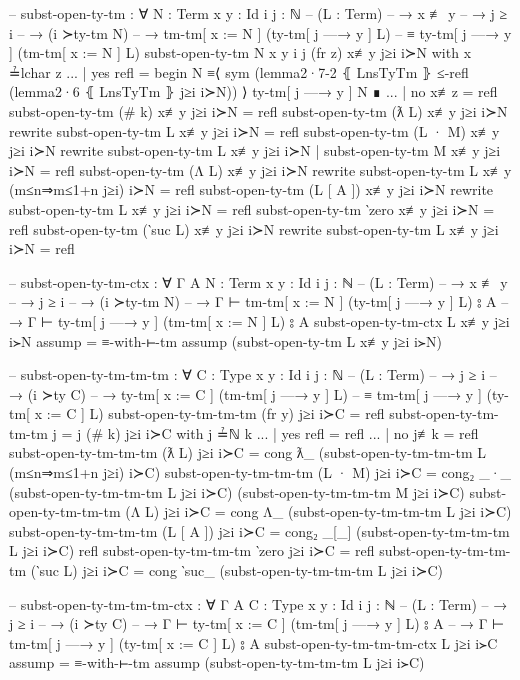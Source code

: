 \documentclass[logo,bsc,singlespacing,parskip,online]{infthesis}
\begin{document}
\begin{code}
  -- subst-open-ty-tm : ∀ {N : Term} {x y : Id} {i j : ℕ}
  --   (L : Term)
  --   → x ≢ y
  --   → j ≥ i
  --   → (i ≻ty-tm N)
  --   → tm-tm[ x := N ] (ty-tm[ j —→ y ] L)
  --     ≡ ty-tm[ j —→ y ] (tm-tm[ x := N ] L)
  subst-open-ty-tm {N} {x} {y} {i} {j} (fr z) x≢y j≥i i≻N with x ≟lchar z
  ... | yes refl =
    begin
      N
    ≡⟨ sym (lemma2·7-2 ⦃ LnsTyTm ⦄ ≤-refl (lemma2·6 ⦃ LnsTyTm ⦄ j≥i i≻N)) ⟩
      ty-tm[ j —→ y ] N
    ∎
  ... | no  x≢z  = refl
  subst-open-ty-tm (# k) x≢y j≥i i≻N = refl
  subst-open-ty-tm (ƛ L) x≢y j≥i i≻N
    rewrite subst-open-ty-tm L x≢y j≥i i≻N = refl
  subst-open-ty-tm (L · M) x≢y j≥i i≻N
    rewrite subst-open-ty-tm L x≢y j≥i i≻N
    | subst-open-ty-tm M x≢y j≥i i≻N
    = refl
  subst-open-ty-tm (Λ L) x≢y j≥i i≻N
    rewrite subst-open-ty-tm L x≢y (m≤n⇒m≤1+n j≥i) i≻N = refl
  subst-open-ty-tm (L [ A ]) x≢y j≥i i≻N
    rewrite subst-open-ty-tm L x≢y j≥i i≻N = refl
  subst-open-ty-tm ‵zero x≢y j≥i i≻N = refl
  subst-open-ty-tm (‵suc L) x≢y j≥i i≻N rewrite
    subst-open-ty-tm L x≢y j≥i i≻N = refl

  -- subst-open-ty-tm-ctx : ∀ {Γ A} {N : Term} {x y : Id} {i j : ℕ}
  --   (L : Term)
  --   → x ≢ y
  --   → j ≥ i
  --   → (i ≻ty-tm N)
  --   → Γ ⊢ tm-tm[ x := N ] (ty-tm[ j —→ y ] L) ⦂ A
  --   → Γ ⊢ ty-tm[ j —→ y ] (tm-tm[ x := N ] L) ⦂ A
  subst-open-ty-tm-ctx L x≢y j≥i i≻N assump = ≡-with-⊢-tm assump (subst-open-ty-tm L x≢y j≥i i≻N)

  -- subst-open-ty-tm-tm-tm : ∀ {C : Type} {x y : Id} {i j : ℕ}
  --   (L : Term)
  --   → j ≥ i
  --   → (i ≻ty C)
  --   → ty-tm[ x := C ] (tm-tm[ j —→ y ] L)
  --     ≡ tm-tm[ j —→ y ] (ty-tm[ x := C ] L)
  subst-open-ty-tm-tm-tm (fr y) j≥i i≻C = refl
  subst-open-ty-tm-tm-tm {j = j} (# k) j≥i i≻C with j ≟ℕ k
  ... | yes refl = refl
  ... | no  j≢k  = refl
  subst-open-ty-tm-tm-tm (ƛ L) j≥i i≻C = cong ƛ_
    (subst-open-ty-tm-tm-tm L (m≤n⇒m≤1+n j≥i) i≻C)
  subst-open-ty-tm-tm-tm (L · M) j≥i i≻C = cong₂ _·_
    (subst-open-ty-tm-tm-tm L j≥i i≻C)
    (subst-open-ty-tm-tm-tm M j≥i i≻C)
  subst-open-ty-tm-tm-tm (Λ L) j≥i i≻C = cong Λ_
    (subst-open-ty-tm-tm-tm L j≥i i≻C)
  subst-open-ty-tm-tm-tm (L [ A ]) j≥i i≻C = cong₂ _[_]
    (subst-open-ty-tm-tm-tm L j≥i i≻C)
    refl
  subst-open-ty-tm-tm-tm ‵zero j≥i i≻C = refl
  subst-open-ty-tm-tm-tm (‵suc L) j≥i i≻C = cong ‵suc_
    (subst-open-ty-tm-tm-tm L j≥i i≻C)

  -- subst-open-ty-tm-tm-tm-ctx : ∀ {Γ A} {C : Type} {x y : Id} {i j : ℕ}
  --   (L : Term)
  --   → j ≥ i
  --   → (i ≻ty C)
  --   → Γ ⊢ ty-tm[ x := C ] (tm-tm[ j —→ y ] L) ⦂ A
  --   → Γ ⊢ tm-tm[ j —→ y ] (ty-tm[ x := C ] L) ⦂ A
  subst-open-ty-tm-tm-tm-ctx L j≥i i≻C assump = ≡-with-⊢-tm assump (subst-open-ty-tm-tm-tm L j≥i i≻C)


\end{code}
\end{document}
